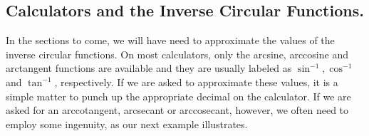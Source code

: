 \documentclass[12pt]{ximera}
\begin{document}
\subsection{Calculators and the Inverse Circular Functions.}
\label{sectionarcstuffoncalc}

In the sections to come, we will have need to approximate the values of the inverse circular functions.  On most calculators, only the arcsine, arccosine and arctangent functions are available and they are usually labeled as $\sin^{-1}, \cos^{-1}$ and $\tan^{-1}$, respectively.  If we are asked to approximate these values, it is a simple matter to punch up the appropriate decimal on the calculator.  If we are asked for an arccotangent, arcsecant or arccosecant, however, we often need to employ some ingenuity, as our next example illustrates.
\end{document}
